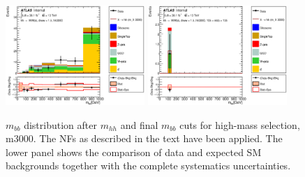 \begin{figure}
\begin{center}
\includegraphics*[width=0.47\textwidth] {figures/Unblinded_mbb/C_reOpt2000_bbpt350_wwpt250_drww15_hh3000_bbMass_regionA_met25d020.eps}
\includegraphics*[width=0.47\textwidth] {figures/Unblinded_mbb/C_reOpt2000_bbpt350_wwpt250_drww15_hh3000_mbb_bbMass_regionA_met25d020.eps}
\caption[$m_{bb}$ distribution after $m_{hh}$ and final $m_{bb}$ cuts for high-mass selection, m3000.]{$m_{bb}$ distribution after $m_{hh}$ and final $m_{bb}$ cuts for high-mass selection, m3000. The NFs as described in the text have been applied. The lower panel shows the comparison of data and expected SM backgrounds together with the complete systematics uncertainties.}
\end{center}
\end{figure}